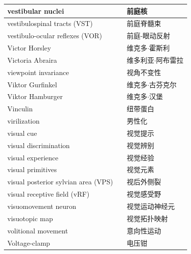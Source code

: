 \begin{longtable}{lll}
	\midrule
	vestibular nuclei   && 前庭核  \\
	
	\midrule
	vestibulospinal tracts (VST)   && 前庭脊髓束  \\
	
	\midrule
	vestibulo-ocular reflexes (VOR)   && 前庭-眼动反射  \\
	
	\midrule
	Victor Horsley   && 维克多$\cdot$霍斯利  \\
	
	\midrule
	Victoria Abraira   && 维多利亚$\cdot$阿布雷拉  \\
	
	\midrule
	viewpoint invariance   && 视角不变性  \\
	
	\midrule
	Viktor Gurfinkel   && 维克多$\cdot$古芬克尔  \\
	
	\midrule
	Viktor Hamburger   && 维克多$\cdot$汉堡  \\
	
	\midrule
	Vinculin   && 纽带蛋白  \\
	
	\midrule
	virilization   && 男性化  \\
	
	\midrule
	visual cue   && 视觉提示  \\
	
	\midrule
	visual discrimination   && 视觉辨别  \\
	
	\midrule
	visual experience   && 视觉经验  \\
	
	\midrule
	visual primitives   && 视觉元素  \\
	
	\midrule
	visual posterior sylvian area (VPS)   && 视后外侧裂  \\
	
	\midrule
	visual receptive field (vRF)  && 视觉感受野  \\
	
	\midrule
	visuomovement neuron  && 视觉运动神经元  \\
	
	\midrule
	visuotopic map  && 视觉拓扑映射  \\
	
	\midrule
	volitional movement  && 意向性运动  \\
	
	\midrule
	Voltage-clamp  && 电压钳  \\
	

\end{longtable}
